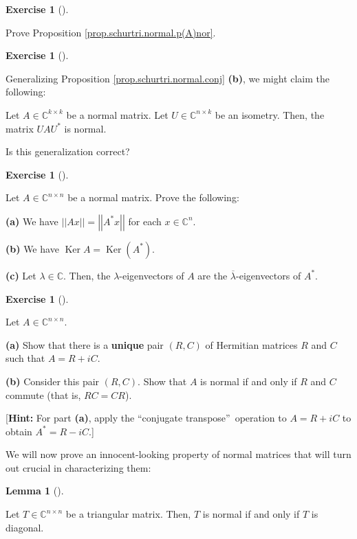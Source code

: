 \documentclass[numbers=enddot,12pt,final,onecolumn,notitlepage]{scrartcl}%
\newcounter{exer}
\numberwithin{exer}{subsection}
\theoremstyle{definition}
\newtheorem{lem}[theo]{Lemma}
\newenvironment{lemma}[1][]
{\begin{lem}[#1]\begin{leftbar}}
{\end{leftbar}\end{lem}}
\newtheorem{exmp}[exer]{Exercise}
\newenvironment{exercise}[1][]
{\begin{exmp}[#1]\begin{leftbar}}
{\end{leftbar}\end{exmp}}
\begin{document}
\begin{exercise}
\label{exe.schurtri.normal.p(A)nor} Prove Proposition
\ref{prop.schurtri.normal.p(A)nor}.
\end{exercise}

\begin{exercise}
\label{exe.schurtri.normal.isometry} Generalizing Proposition
\ref{prop.schurtri.normal.conj} \textbf{(b)}, we might claim the following:

Let $A\in\mathbb{C}^{k\times k}$ be a normal matrix. Let $U\in\mathbb{C}%
^{n\times k}$ be an isometry. Then, the matrix $UAU^{\ast}$ is normal.

Is this generalization correct?
\end{exercise}

\begin{exercise}
\label{exe.schurtri.normal.A*x} Let $A\in\mathbb{C}^{n\times n}$ be a
normal matrix. Prove the following: \medskip

\textbf{(a)} We have $\left\vert \left\vert Ax\right\vert \right\vert
=\left\vert \left\vert A^{\ast}x\right\vert \right\vert $ for each
$x\in\mathbb{C}^{n}$. \medskip

\textbf{(b)} We have $\operatorname*{Ker}A=\operatorname*{Ker}\left(  A^{\ast
}\right)  $. \medskip

\textbf{(c)} Let $\lambda\in\mathbb{C}$. Then, the $\lambda$-eigenvectors of
$A$ are the $\overline{\lambda}$-eigenvectors of $A^{\ast}$.
\end{exercise}

\begin{exercise}
 Let $A\in\mathbb{C}^{n\times n}$. \medskip

\textbf{(a)} Show that there is a \textbf{unique} pair $\left(  R,C\right)  $
of Hermitian matrices $R$ and $C$ such that $A=R+iC$. \medskip

\textbf{(b)} Consider this pair $\left(  R,C\right)  $. Show that $A$ is
normal if and only if $R$ and $C$ commute (that is, $RC=CR$). \medskip

[\textbf{Hint:} For part \textbf{(a)}, apply the \textquotedblleft conjugate
transpose\textquotedblright\ operation to $A=R+iC$ to obtain $A^{\ast}=R-iC$.]
\end{exercise}

We will now prove an innocent-looking property of normal matrices that will
turn out crucial in characterizing them:

\begin{lemma}
\label{lem.schurtri.normal.tri}Let $T\in\mathbb{C}^{n\times n}$ be a
triangular matrix. Then, $T$ is normal if and only if $T$ is diagonal.
\end{lemma}
\end{document}
